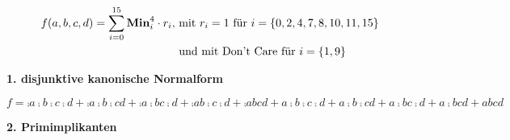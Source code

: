 \documentclass{CInf_practice}
\begin{document}
\cinftitle


\begin{align*}
f(a,b,c,d) = \sum\limits^{15}_{i=0} \text{\bf Min}^{4}_i \cdot r_i, &\text{ mit } r_i=1 \text{ für } i = \left\{0,2,4,7,8,10,11,15\right\}\\
& \text{ und mit Don't Care für } i=\left\{1,9\right\}
\end{align*}


\textbf{1. disjunktive kanonische Normalform}

$f = \comp a \comp b \comp c \comp d
   + \comp a \comp b \comp c       d
   + \comp a \comp b       c \comp d 
   + \comp a       b \comp c \comp d
   + \comp a       b       c       d 
   +       a \comp b \comp c \comp d
   +       a \comp b \comp c       d   
   +       a \comp b       c \comp d 
   +       a \comp b       c       d 
   +       a       b       c       d$

\bigskip

\textbf{2. Primimplikanten}
\end{document}
